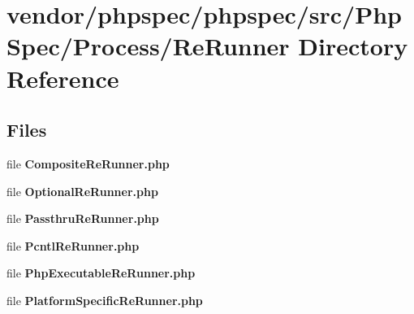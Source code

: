 \section{vendor/phpspec/phpspec/src/\+Php\+Spec/\+Process/\+Re\+Runner Directory Reference}
\label{dir_84046adc44624c814dfee394ea531cbb}
\subsection*{Files}
\begin{DoxyCompactItemize}
\item 
file {\bf Composite\+Re\+Runner.\+php}
\item 
file {\bf Optional\+Re\+Runner.\+php}
\item 
file {\bf Passthru\+Re\+Runner.\+php}
\item 
file {\bf Pcntl\+Re\+Runner.\+php}
\item 
file {\bf Php\+Executable\+Re\+Runner.\+php}
\item 
file {\bf Platform\+Specific\+Re\+Runner.\+php}
\end{DoxyCompactItemize}
